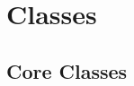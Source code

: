 \chapter{Classes}

\section{Core Classes}

\pagebreak

\pagebreak

\pagebreak

\pagebreak

\pagebreak

\pagebreak

\pagebreak